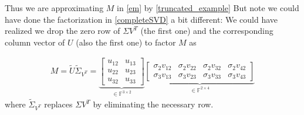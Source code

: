 \documentclass[11.5pt]{article}
\theoremstyle{definition}
\begin{document}
Thus we are approximating $M$ in \eqref{em} by \eqref{truncated_example}
But note we could have done the factorization in \eqref{completeSVD} a bit different: We could have realized we drop the zero row of $\Sigma V^T$ (the first one) and the corresponding column vector of $U$ (also the first one) to factor $M$ as 

\begin{align}\label{completeSVD2}
 M=\widetilde{U}\widetilde{\Sigma}_{V^T}=
\underbrace{\begin{bmatrix}
 u_{12} & u_{13} \\ 
  u_{22} & u_{23} \\ 
 u_{32} & u_{33}
\end{bmatrix}}_{ \in \mathbb{F}^{3\times 2}}
\underbrace{
\begin{bmatrix}
\sigma_2 v_{12} & \sigma_2 v_{22} & \sigma_2v_{32} & \sigma_2v_{42}\\
\sigma_3 v_{13} & \sigma_3 v_{23} & \sigma_3 v_{33} & \sigma_3v_{43}
\end{bmatrix}}_{ \in \mathbb{F}^{2\times 4}}
\end{align}
where $\widetilde{\Sigma}_{V^T}$ replaces $\Sigma V^T$ by eliminating the necessary row. 




\newpage
\newpage
\end{document}
